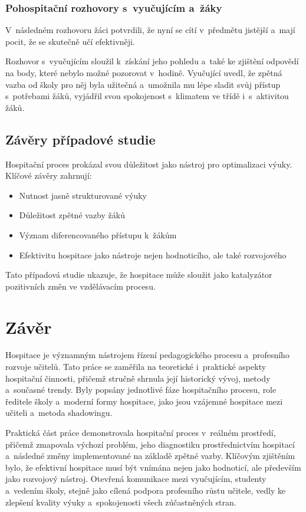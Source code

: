 \subsubsection*{Pohospitační rozhovory s~vyučujícím a~žáky}

V~následném rozhovoru žáci potvrdili, že nyní se cítí v~předmětu jistější a~mají pocit, že se skutečně učí efektivněji. 

Rozhovor s~vyučujícím sloužil k~získání jeho pohledu a~také ke zjištění odpovědí na body, které nebylo možné pozorovat v~hodině. Vyučující uvedl, že zpětná vazba od školy pro něj byla užitečná a~umožnila mu lépe sladit svůj přístup s~potřebami žáků, vyjádřil svou spokojenost s~klimatem ve třídě i~s~aktivitou žáků.

\subsection{Závěry případové studie}

Hospitační proces prokázal svou důležitost jako nástroj pro optimalizaci výuky. Klíčové závěry zahrnují:

\begin{itemize}
    \item Nutnost jasně strukturované výuky
    \item Důležitost zpětné vazby žáků
    \item Význam diferencovaného přístupu k~žákům
    \item Efektivitu hospitace jako nástroje nejen hodnoticího, ale také rozvojového
\end{itemize}

Tato případová studie ukazuje, že hospitace může sloužit jako katalyzátor pozitivních změn ve vzdělávacím procesu.


\newpage
\section*{Závěr} 

Hospitace je významným nástrojem řízení pedagogického procesu a~profesního rozvoje učitelů. Tato práce se zaměřila na teoretické i~praktické aspekty hospitační činnosti, přičemž stručně shrnula její historický vývoj, metody a~současné trendy. Byly popsány jednotlivé fáze hospitačního procesu, role ředitele školy a~moderní formy hospitace, jako jsou vzájemné hospitace mezi učiteli a~metoda shadowingu.

Praktická část práce demonstrovala hospitační proces v~reálném prostředí, přičemž zmapovala výchozí problém, jeho diagnostiku prostřednictvím hospitací a~následné změny implementované na základě zpětné vazby. Klíčovým zjištěním bylo, že efektivní hospitace musí být vnímána nejen jako hodnoticí, ale především jako rozvojový nástroj. Otevřená komunikace mezi vyučujícím, studenty a~vedením školy, stejně jako cílená podpora profesního růstu učitele, vedly ke zlepšení kvality výuky a~spokojenosti všech zúčastněných stran.

